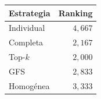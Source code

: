 \begin{resulttable}
\centering\fontsize{8}{10}\selectfont\setlength{\tabcolsep}{3.0pt}
\caption{Rankings medios de Friedman en macro-F1, con un bloque por cada uno de los seis datasets. Menor ranking indica mejor desempeño relativo.}
\label{tab:friedman-primary}
\begin{tabular}{@{}lr@{}}
\toprule
Estrategia & Ranking \\
\midrule
Individual & $4{,}667$ \\
Completa & $2{,}167$ \\
Top-$k$ & $2{,}000$ \\
GFS & $2{,}833$ \\
Homogénea & $3{,}333$ \\
\bottomrule
\end{tabular}
\end{resulttable}
\FloatBarrier
